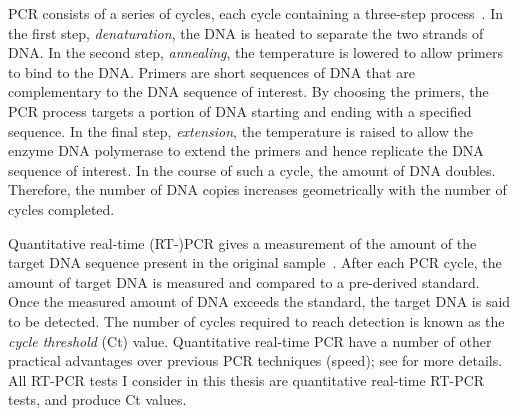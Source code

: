 \documentclass[thesis.tex]{subfiles}
\begin{document}

PCR consists of a series of cycles, each cycle containing a three-step process~\autocite{powledgePCR,garibyanPCR}.
In the first step, \emph{denaturation}, the DNA is heated to separate the two strands of DNA.
In the second step, \emph{annealing}, the temperature is lowered to allow primers to bind to the DNA.
Primers are short sequences of DNA that are complementary to the DNA sequence of interest.
By choosing the primers, the PCR process targets a portion of DNA starting and ending with a specified sequence.
In the final step, \emph{extension}, the temperature is raised to allow the enzyme DNA polymerase to extend the primers and hence replicate the DNA sequence of interest.
In the course of such a cycle, the amount of DNA doubles.
Therefore, the number of DNA copies increases geometrically with the number of cycles completed.

Quantitative real-time (RT-)PCR gives a measurement of the amount of the target DNA sequence present in the original sample~\autocite{yangPCRdiagnostics}.
After each PCR cycle, the amount of target DNA is measured and compared to a pre-derived standard.
Once the measured amount of DNA exceeds the standard, the target DNA is said to be detected.
The number of cycles required to reach detection is known as the \emph{cycle threshold} (Ct) value.
Quantitative real-time PCR have a number of other practical advantages over previous PCR techniques (\eg speed); see \textcite{yangPCRdiagnostics,valasekPower} for more details.
All RT-PCR tests I consider in this thesis are quantitative real-time RT-PCR tests, and produce Ct values.
\end{document}
